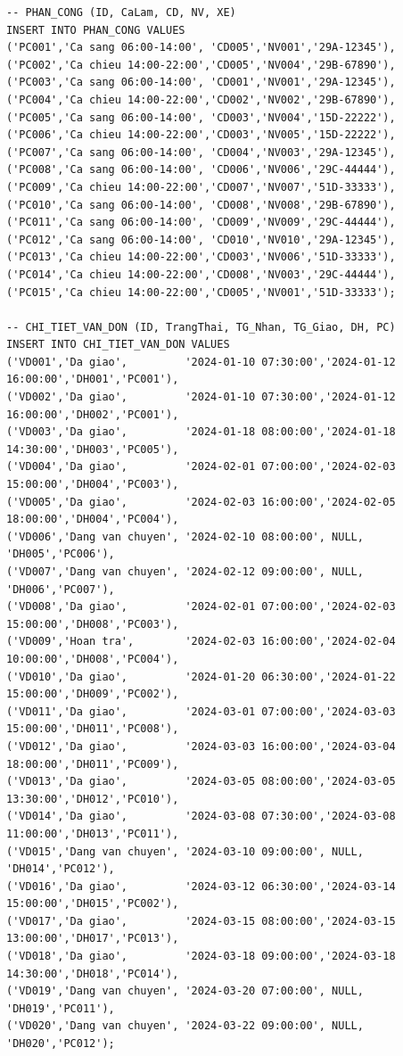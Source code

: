 \documentclass[11pt]{report}
\begin{document}
\begin{verbatim}
-- PHAN_CONG (ID, CaLam, CD, NV, XE)
INSERT INTO PHAN_CONG VALUES
('PC001','Ca sang 06:00-14:00', 'CD005','NV001','29A-12345'),
('PC002','Ca chieu 14:00-22:00','CD005','NV004','29B-67890'),
('PC003','Ca sang 06:00-14:00', 'CD001','NV001','29A-12345'),
('PC004','Ca chieu 14:00-22:00','CD002','NV002','29B-67890'),
('PC005','Ca sang 06:00-14:00', 'CD003','NV004','15D-22222'),
('PC006','Ca chieu 14:00-22:00','CD003','NV005','15D-22222'),
('PC007','Ca sang 06:00-14:00', 'CD004','NV003','29A-12345'),
('PC008','Ca sang 06:00-14:00', 'CD006','NV006','29C-44444'),
('PC009','Ca chieu 14:00-22:00','CD007','NV007','51D-33333'),
('PC010','Ca sang 06:00-14:00', 'CD008','NV008','29B-67890'),
('PC011','Ca sang 06:00-14:00', 'CD009','NV009','29C-44444'),
('PC012','Ca sang 06:00-14:00', 'CD010','NV010','29A-12345'),
('PC013','Ca chieu 14:00-22:00','CD003','NV006','51D-33333'),
('PC014','Ca chieu 14:00-22:00','CD008','NV003','29C-44444'),
('PC015','Ca chieu 14:00-22:00','CD005','NV001','51D-33333');

-- CHI_TIET_VAN_DON (ID, TrangThai, TG_Nhan, TG_Giao, DH, PC)
INSERT INTO CHI_TIET_VAN_DON VALUES
('VD001','Da giao',         '2024-01-10 07:30:00','2024-01-12 16:00:00','DH001','PC001'),
('VD002','Da giao',         '2024-01-10 07:30:00','2024-01-12 16:00:00','DH002','PC001'),
('VD003','Da giao',         '2024-01-18 08:00:00','2024-01-18 14:30:00','DH003','PC005'),
('VD004','Da giao',         '2024-02-01 07:00:00','2024-02-03 15:00:00','DH004','PC003'),
('VD005','Da giao',         '2024-02-03 16:00:00','2024-02-05 18:00:00','DH004','PC004'),
('VD006','Dang van chuyen', '2024-02-10 08:00:00', NULL,                'DH005','PC006'),
('VD007','Dang van chuyen', '2024-02-12 09:00:00', NULL,                'DH006','PC007'),
('VD008','Da giao',         '2024-02-01 07:00:00','2024-02-03 15:00:00','DH008','PC003'),
('VD009','Hoan tra',        '2024-02-03 16:00:00','2024-02-04 10:00:00','DH008','PC004'),
('VD010','Da giao',         '2024-01-20 06:30:00','2024-01-22 15:00:00','DH009','PC002'),
('VD011','Da giao',         '2024-03-01 07:00:00','2024-03-03 15:00:00','DH011','PC008'),
('VD012','Da giao',         '2024-03-03 16:00:00','2024-03-04 18:00:00','DH011','PC009'),
('VD013','Da giao',         '2024-03-05 08:00:00','2024-03-05 13:30:00','DH012','PC010'),
('VD014','Da giao',         '2024-03-08 07:30:00','2024-03-08 11:00:00','DH013','PC011'),
('VD015','Dang van chuyen', '2024-03-10 09:00:00', NULL,                'DH014','PC012'),
('VD016','Da giao',         '2024-03-12 06:30:00','2024-03-14 15:00:00','DH015','PC002'),
('VD017','Da giao',         '2024-03-15 08:00:00','2024-03-15 13:00:00','DH017','PC013'),
('VD018','Da giao',         '2024-03-18 09:00:00','2024-03-18 14:30:00','DH018','PC014'),
('VD019','Dang van chuyen', '2024-03-20 07:00:00', NULL,                'DH019','PC011'),
('VD020','Dang van chuyen', '2024-03-22 09:00:00', NULL,                'DH020','PC012');
\end{verbatim}
\end{document}
